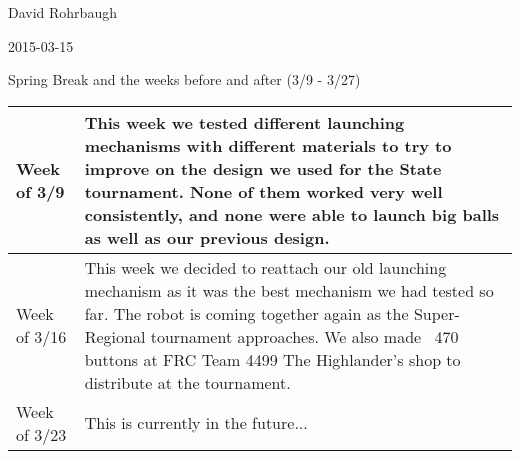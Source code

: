 David Rohrbaugh

2015-03-15

Spring Break and the weeks before and after (3/9 - 3/27)

\begin{tabular}{|p{5cm}|p{5cm}|}
 \hline
 Week of 3/9&
 This week we tested different launching mechanisms with different materials to try to improve on the design we used for the State tournament. None of them worked very well consistently, and none were able to launch big balls as well as our previous design.\\
\hline
 Week of 3/16&
 This week we decided to reattach our old launching mechanism as it was the best mechanism we had tested so far. The robot is coming together again as the Super-Regional tournament approaches. We also made ~470 buttons at FRC Team 4499 The Highlander's shop to distribute at the tournament.\\
\hline
 Week of 3/23&
 This is currently in the future...\\
 \hline
\end{tabular}
